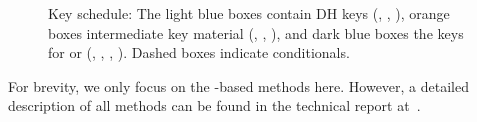 \begin{figure}[h]
\centering
\scalebox{.785}{

}
\caption{Key schedule: The light blue boxes contain DH keys (\mGxy, \mGrx, \mGiy), orange boxes intermediate key material (\mPRKtwo, \mPRKthree, \mPRKfour), and dark blue boxes the keys for \mAead{} or \mXor (\mKtwoe, \mKtwom, \mKthreeae, \mKthreem). Dashed boxes indicate conditionals.}
\label{fig:kdfdiagram}
\end{figure}

%

For brevity, we only focus on the \mStat-based methods here.
%
However, a detailed description of all methods can be found in the
technical report at~\cite{edhocTamarinRepo}. 
%

